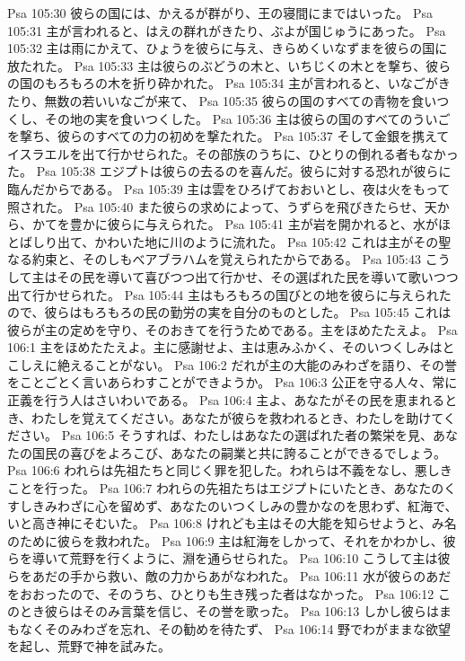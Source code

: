 Psa 105:30  彼らの国には、かえるが群がり、王の寝間にまではいった。
Psa 105:31  主が言われると、はえの群れがきたり、ぶよが国じゅうにあった。
Psa 105:32  主は雨にかえて、ひょうを彼らに与え、きらめくいなずまを彼らの国に放たれた。
Psa 105:33  主は彼らのぶどうの木と、いちじくの木とを撃ち、彼らの国のもろもろの木を折り砕かれた。
Psa 105:34  主が言われると、いなごがきたり、無数の若いいなごが来て、
Psa 105:35  彼らの国のすべての青物を食いつくし、その地の実を食いつくした。
Psa 105:36  主は彼らの国のすべてのういごを撃ち、彼らのすべての力の初めを撃たれた。
Psa 105:37  そして金銀を携えてイスラエルを出て行かせられた。その部族のうちに、ひとりの倒れる者もなかった。
Psa 105:38  エジプトは彼らの去るのを喜んだ。彼らに対する恐れが彼らに臨んだからである。
Psa 105:39  主は雲をひろげておおいとし、夜は火をもって照された。
Psa 105:40  また彼らの求めによって、うずらを飛びきたらせ、天から、かてを豊かに彼らに与えられた。
Psa 105:41  主が岩を開かれると、水がほとばしり出て、かわいた地に川のように流れた。
Psa 105:42  これは主がその聖なる約束と、そのしもべアブラハムを覚えられたからである。
Psa 105:43  こうして主はその民を導いて喜びつつ出て行かせ、その選ばれた民を導いて歌いつつ出て行かせられた。
Psa 105:44  主はもろもろの国びとの地を彼らに与えられたので、彼らはもろもろの民の勤労の実を自分のものとした。
Psa 105:45  これは彼らが主の定めを守り、そのおきてを行うためである。主をほめたたえよ。
Psa 106:1  主をほめたたえよ。主に感謝せよ、主は恵みふかく、そのいつくしみはとこしえに絶えることがない。
Psa 106:2  だれが主の大能のみわざを語り、その誉をことごとく言いあらわすことができようか。
Psa 106:3  公正を守る人々、常に正義を行う人はさいわいである。
Psa 106:4  主よ、あなたがその民を恵まれるとき、わたしを覚えてください。あなたが彼らを救われるとき、わたしを助けてください。
Psa 106:5  そうすれば、わたしはあなたの選ばれた者の繁栄を見、あなたの国民の喜びをよろこび、あなたの嗣業と共に誇ることができるでしょう。
Psa 106:6  われらは先祖たちと同じく罪を犯した。われらは不義をなし、悪しきことを行った。
Psa 106:7  われらの先祖たちはエジプトにいたとき、あなたのくすしきみわざに心を留めず、あなたのいつくしみの豊かなのを思わず、紅海で、いと高き神にそむいた。
Psa 106:8  けれども主はその大能を知らせようと、み名のために彼らを救われた。
Psa 106:9  主は紅海をしかって、それをかわかし、彼らを導いて荒野を行くように、淵を通らせられた。
Psa 106:10  こうして主は彼らをあだの手から救い、敵の力からあがなわれた。
Psa 106:11  水が彼らのあだをおおったので、そのうち、ひとりも生き残った者はなかった。
Psa 106:12  このとき彼らはそのみ言葉を信じ、その誉を歌った。
Psa 106:13  しかし彼らはまもなくそのみわざを忘れ、その勧めを待たず、
Psa 106:14  野でわがままな欲望を起し、荒野で神を試みた。

